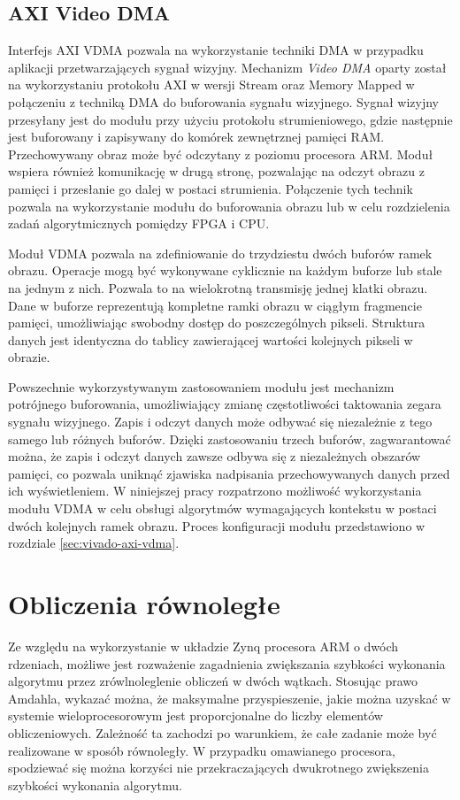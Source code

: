 \subsection{AXI Video DMA}
\label{sec:axi-vdma}
Interfejs AXI VDMA pozwala na wykorzystanie techniki DMA w przypadku aplikacji przetwarzających sygnał wizyjny.
Mechanizm \emph{Video DMA} oparty został na wykorzystaniu protokołu AXI w wersji Stream oraz Memory Mapped w połączeniu z techniką DMA do buforowania sygnału wizyjnego. 
Sygnał wizyjny przesyłany jest do modułu przy użyciu protokołu strumieniowego, gdzie następnie jest buforowany i zapisywany do komórek zewnętrznej pamięci RAM. 
Przechowywany obraz może być odczytany z poziomu procesora ARM.
Moduł wspiera również komunikację w drugą stronę, pozwalając na odczyt obrazu z pamięci i przesłanie go dalej w postaci strumienia. 
Połączenie tych technik pozwala na wykorzystanie modułu do buforowania obrazu lub w celu rozdzielenia zadań algorytmicznych pomiędzy FPGA i CPU.

Moduł VDMA pozwala na zdefiniowanie do trzydziestu dwóch buforów ramek obrazu. 
Operacje mogą być wykonywane cyklicznie na każdym buforze lub stale na jednym z nich. 
Pozwala to na wielokrotną transmisję jednej klatki obrazu.
Dane w buforze reprezentują kompletne ramki obrazu w ciągłym fragmencie pamięci, umożliwiając swobodny dostęp do poszczególnych pikseli. Struktura danych jest identyczna do tablicy zawierającej wartości kolejnych pikseli w obrazie.

Powszechnie wykorzystywanym zastosowaniem modułu jest mechanizm potrójnego buforowania, umożliwiający zmianę częstotliwości taktowania zegara sygnału wizyjnego. 
Zapis i odczyt danych może odbywać się niezależnie z tego samego lub różnych buforów. 
Dzięki zastosowaniu trzech buforów, zagwarantować można, że zapis i odczyt danych zawsze odbywa się z niezależnych obszarów pamięci, co pozwala uniknąć zjawiska nadpisania przechowywanych danych przed ich wyświetleniem.
W niniejszej pracy rozpatrzono możliwość wykorzystania modułu VDMA w celu obsługi algorytmów wymagających kontekstu w postaci dwóch kolejnych ramek obrazu.
Proces konfiguracji modułu przedstawiono w rozdziale \ref{sec:vivado-axi-vdma}.

\section{Obliczenia równoległe}
\label{sec:openmp}

Ze względu na wykorzystanie w układzie Zynq procesora ARM o dwóch rdzeniach, możliwe jest rozważenie zagadnienia zwiększania szybkości wykonania algorytmu przez zrówlnoleglenie obliczeń w dwóch wątkach. 
Stosując prawo Amdahla, wykazać można, że maksymalne przyspieszenie, jakie można uzyskać w systemie wieloprocesorowym jest proporcjonalne do liczby elementów obliczeniowych. 
Zależność ta zachodzi po warunkiem, że całe zadanie może być realizowane w sposób równoległy. 
W przypadku omawianego procesora, spodziewać się można korzyści nie przekraczających dwukrotnego zwiększenia szybkości wykonania algorytmu.

